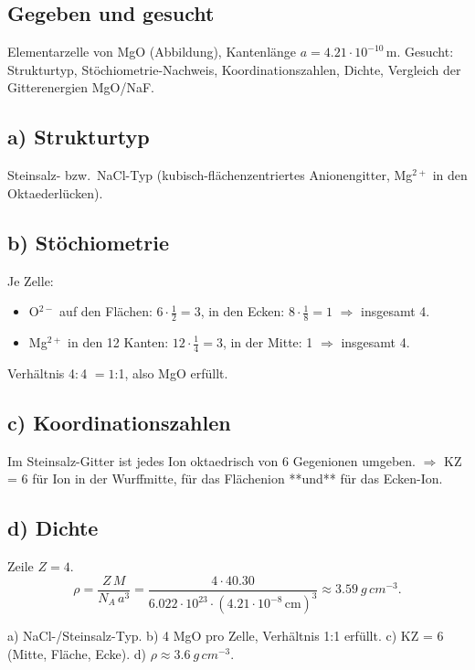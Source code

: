 
\subsection*{Gegeben und gesucht}
Elementarzelle von MgO (Abbildung), Kantenlänge
$a = 4.21\cdot10^{-10}\,$m. Gesucht: Strukturtyp, Stöchiometrie-Nachweis,
Koordinationszahlen, Dichte, Vergleich der Gitterenergien MgO/NaF.

\subsection*{a) Strukturtyp}
Steinsalz- bzw.\ NaCl-Typ (kubisch-flächenzentriertes Anionengitter, Mg$^{2+}$
in den Oktaederlücken).

\subsection*{b) Stöchiometrie}
Je Zelle:
\begin{itemize}
  \item O$^{2-}$ auf den Flächen: $6\cdot\frac{1}{2} = 3$, in den Ecken:
        $8\cdot\frac{1}{8} = 1$ $\Rightarrow$ insgesamt 4.
  \item Mg$^{2+}$ in den 12 Kanten: $12\cdot\frac{1}{4}=3$, in der Mitte: 1
        $\Rightarrow$ insgesamt 4.
\end{itemize}
Verhältnis 4$:$4 $= 1$:1, also MgO erfüllt.

\subsection*{c) Koordinationszahlen}
Im Steinsalz-Gitter ist jedes Ion oktaedrisch von 6 Gegenionen umgeben.
$\Rightarrow$ KZ = 6 für Ion in der Wurffmitte, für das Flächenion **und**
für das Ecken-Ion.

\subsection*{d) Dichte}
Zeile $Z=4$.
\[
  \rho = \frac{Z\,M}{N_A\,a^3}
       = \frac{4\cdot 40.30}{6.022\cdot10^{23}\cdot(4.21\cdot10^{-8}\,\text{cm})^3}
       \approx 3.59\ g\,cm^{-3}.
\]

\begin{ergebnis}
a) NaCl-/Steinsalz-Typ. b) 4 MgO pro Zelle, Verhältnis 1:1 erfüllt.
c) KZ = 6 (Mitte, Fläche, Ecke). d) $\rho \approx 3.6\ g\,cm^{-3}$.
\end{ergebnis}

